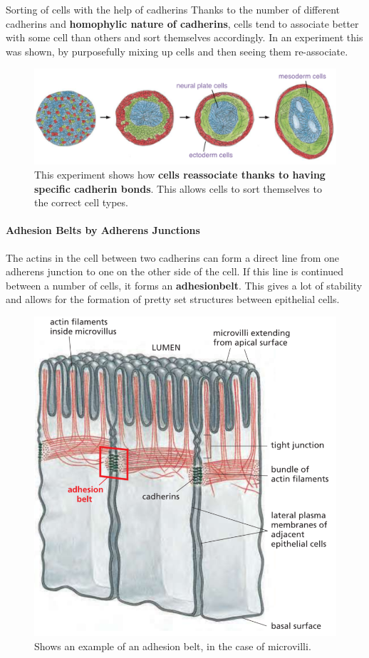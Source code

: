 \documentclass[../main.tex]{subfiles}
\begin{document}
\begin{RemarkWithTitel}{Sorting of cells with the help of cadherins}
	Thanks to the number of different cadherins and \textbf{homophylic nature of cadherins}, cells tend to associate better with some cell than others and sort themselves accordingly. In an experiment this was shown, by purposefully mixing up cells and then seeing them re-associate.
	
	\begin{figure}[H]
		\centering
		\includegraphics[width=0.5\linewidth]{cad_reas}
		\caption{This experiment shows how \textbf{cells reassociate thanks to having specific cadherin bonds}. This allows cells to sort themselves to the correct cell types.}
		\label{fig:cadreas}
	\end{figure}
	
\end{RemarkWithTitel}

\paragraph{Adhesion Belts by Adherens Junctions}

The actins in the cell between two cadherins can form a direct line from one adherens junction to one on the other side of the cell. If this line is continued between a number of cells, it forms an \textbf{\gls{adhesionbelt}}. This gives a lot of stability and allows for the formation of pretty set structures between epithelial cells. 

\begin{figure}[H]
	\centering
	\includegraphics[width=0.4\linewidth]{cad_micr}
	\caption{Shows an example of an adhesion belt, in the case of \gls{microvilli}.}
	\label{fig:cadmicr}
\end{figure}
\end{document}
